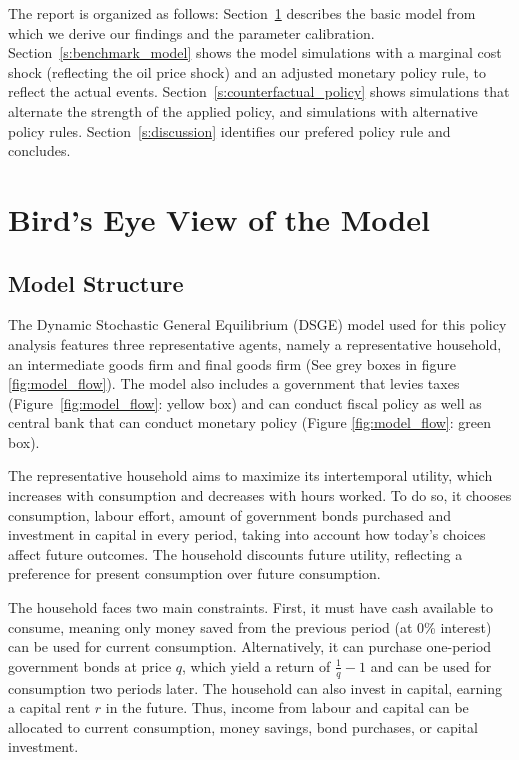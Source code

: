 \documentclass[12pt]{article}
\begin{document}
The report is organized as follows: Section~\ref{s:model_description} describes the basic model from which we derive our findings and the parameter calibration. Section~\ref{s:benchmark_model} shows the model simulations with a marginal cost shock (reflecting the oil price shock) and an adjusted monetary policy rule, to reflect the actual events. Section~\ref{s:counterfactual_policy} shows simulations that alternate the strength of the applied policy, and simulations with alternative policy rules. Section~\ref{s:discussion} identifies our prefered policy rule and concludes. 

\newpage
\section{Bird’s Eye View of the Model}\label{s:model_description}


\subsection*{Model Structure}
The Dynamic Stochastic General Equilibrium (DSGE) model used for this policy analysis features
three representative agents, namely a representative household, an intermediate goods firm and final goods firm (See grey boxes in figure \ref{fig:model_flow}). The model also includes a government that levies taxes (Figure~\ref{fig:model_flow}: yellow box) and can conduct fiscal policy as well as central bank that can conduct monetary policy (Figure \ref{fig:model_flow}: green box).

The representative household aims to maximize its intertemporal utility, which increases with consumption and decreases with hours worked. To do so, it chooses consumption, labour effort, amount of government bonds purchased and investment in capital in every period, taking into account how today's choices affect future outcomes. The household discounts future utility, reflecting a preference for present consumption over future consumption.

The household faces two main constraints. First, it must have cash available to consume, meaning only money saved from the previous period (at 0\% interest) can be used for current consumption. Alternatively, it can purchase one-period government bonds at price $q$, which yield a return of $\frac{1}{q} - 1$ and can be used for consumption two periods later. The household can also invest in capital, earning a capital rent $r$ in the future. Thus, income from labour and capital can be allocated to current consumption, money savings, bond purchases, or capital investment.
\end{document}
